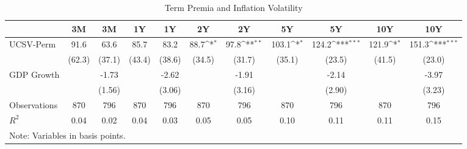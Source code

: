 \begin{table}[htbp]\centering
\def\sym#1{\ifmmode^{#1}\else\(^{#1}\)\fi}
\caption{Term Premia and Inflation Volatility}
\label{tpucsv}
\begin{tabular*}{0.8\hsize}{@{\hskip\tabcolsep\extracolsep\fill}l*{10}{c}}
\toprule
                    &\multicolumn{1}{c}{3M}&\multicolumn{1}{c}{3M}&\multicolumn{1}{c}{1Y}&\multicolumn{1}{c}{1Y}&\multicolumn{1}{c}{2Y}&\multicolumn{1}{c}{2Y}&\multicolumn{1}{c}{5Y}&\multicolumn{1}{c}{5Y}&\multicolumn{1}{c}{10Y}&\multicolumn{1}{c}{10Y}\\
\midrule
UCSV-Perm           &        91.6         &        63.6         &        85.7         &        83.2         &        88.7\sym{*}  &        97.8\sym{**} &       103.1\sym{*}  &       124.2\sym{***}&       121.9\sym{*}  &       151.3\sym{***}\\
                    &      (62.3)         &      (37.1)         &      (43.4)         &      (38.6)         &      (34.5)         &      (31.7)         &      (35.1)         &      (23.5)         &      (41.5)         &      (23.0)         \\
\addlinespace
GDP Growth          &                     &       -1.73         &                     &       -2.62         &                     &       -1.91         &                     &       -2.14         &                     &       -3.97         \\
                    &                     &      (1.56)         &                     &      (3.06)         &                     &      (3.16)         &                     &      (2.90)         &                     &      (3.23)         \\
\midrule
Observations        &         870         &         796         &         870         &         796         &         870         &         796         &         870         &         796         &         870         &         796         \\
\(R^{2}\)           &        0.04         &        0.02         &        0.04         &        0.03         &        0.05         &        0.05         &        0.10         &        0.11         &        0.11         &        0.15         \\
\bottomrule
\multicolumn{11}{l}{\footnotesize Note: Variables in basis points.}\\
\end{tabular*}
\end{table}
